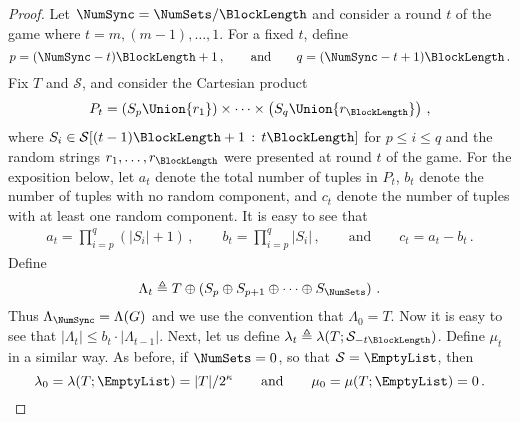 \begin{proof}
Let $\NumSync = \NumSets/\BlockLength$ and 
consider a round $t$ of the game where $t = m, (m-1), \ldots, 1$. 
For a fixed $t$, define 
\[
    p = (\NumSync - t)\BlockLength +1\,, 
    \qquad \text{and}\qquad 
    q = (\NumSync - t + 1)\BlockLength
    \,.
\]
Fix $T$ and $\mathcal{S}$, and consider the Cartesian product 
\[
    P_t = \left(S_{p} \Union \{r_1\}\right) \times \cdots \times 
    \left(S_{q}  \Union \{r_\BlockLength\}\right)
    \,,
\] 
where $S_i \in \mathcal{S}[(t-1)\BlockLength +1\, : \, t \BlockLength]$ for $p \leq i \leq q$ and the 
random strings $r_1, \ldots, r_\BlockLength$ were presented at round $t$ of the game.
For the exposition below, let $a_t$ denote the total number of tuples in $P_t$, 
$b_t$ denote the number of tuples with no random component, 
and $c_t$ denote the number of tuples with at least one random component. 
It is easy to see that 
\begin{align}\label{eq:a-b-c-tuplecount}
    a_t = \prod_{i=p}^q (|S_i| + 1)\,,\qquad 
    b_t = \prod_{i=p}^q {|S_i|}\,,\qquad\text{and}\qquad
    c_t = a_t - b_t
    \,.
\end{align}
Define 
\[
    \Lambda_t \triangleq 
    T \oplus \left( 
        S_{p} \oplus 
        S_{p + 1} \oplus 
        \cdots \oplus 
        S_{\NumSets} \right)
        \,.
\]
Thus $\Lambda_\NumSync = \Lambda(G)$ and we use the convention that $\Lambda_0 = T$. 
Now it is easy to see that $|\Lambda_t| \leq b_t \cdot |\Lambda_{t-1}|$. 
Next, let us define $\lambda_t \triangleq \lambda(T; \mathcal{S}_{-t \BlockLength})$. 
Define $\mu_t$ in a similar way. 
As before, if $\NumSets = 0$, so that $\mathcal{S} = \EmptyList$, then
\[
    \lambda_0 = \lambda(T; \EmptyList)=|T|/2^\kappa 
    \qquad\text{and}\qquad 
    \mu_0 = \mu(T; \EmptyList) = 0
    \,.
\]



\end{proof}
